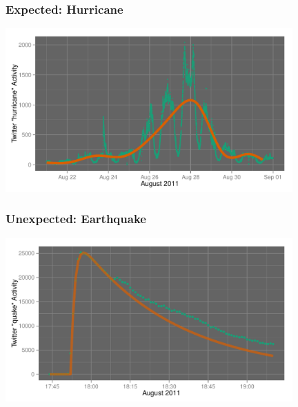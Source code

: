 \documentclass{beamer}
\begin{document}
\begin{frame}\frametitle{Expected: Hurricane}
  \begin{center}
    \includegraphics[width=11cm]{./imgs/hurricane_trend.pdf}
  \end{center}
\end{frame}
%

\begin{frame}\frametitle{Unexpected: Earthquake}
  \begin{center}
    \includegraphics[width=11cm]{./imgs/va_quake_fit1.pdf}
  \end{center}
\end{frame}

\end{document}
